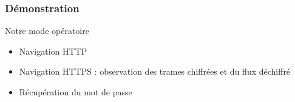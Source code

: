 \begin{frame}
\frametitle{Démonstration}
Notre mode opératoire
\begin{itemize}
\item Navigation HTTP
\item Navigation HTTPS : observation des trames chiffrées et du flux déchiffré
\item Récupération du mot de passe
\end{itemize}
\end{frame}